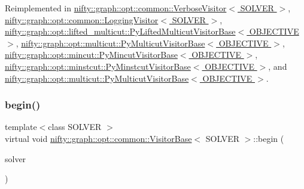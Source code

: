 Reimplemented in \hyperlink{classnifty_1_1graph_1_1opt_1_1common_1_1VerboseVisitor_a7ce06c6374afec8ecf6e5ceca4669682}{nifty\+::graph\+::opt\+::common\+::\+Verbose\+Visitor$<$ S\+O\+L\+V\+E\+R $>$}, \hyperlink{classnifty_1_1graph_1_1opt_1_1common_1_1LoggingVisitor_a19ea135ecf8fbc92a8a7792164c4fd44}{nifty\+::graph\+::opt\+::common\+::\+Logging\+Visitor$<$ S\+O\+L\+V\+E\+R $>$}, \hyperlink{classnifty_1_1graph_1_1opt_1_1lifted__multicut_1_1PyLiftedMulticutVisitorBase_ad7e8835d70def796b71cff0caa79c596}{nifty\+::graph\+::opt\+::lifted\+\_\+multicut\+::\+Py\+Lifted\+Multicut\+Visitor\+Base$<$ O\+B\+J\+E\+C\+T\+I\+V\+E $>$}, \hyperlink{classnifty_1_1graph_1_1opt_1_1multicut_1_1PyMulticutVisitorBase_a6b6922de3a94d5c872ecfff2a845a03b}{nifty\+::graph\+::opt\+::multicut\+::\+Py\+Multicut\+Visitor\+Base$<$ O\+B\+J\+E\+C\+T\+I\+V\+E $>$}, \hyperlink{classnifty_1_1graph_1_1opt_1_1mincut_1_1PyMincutVisitorBase_a99c335cf50430f381e66e826f6805e5b}{nifty\+::graph\+::opt\+::mincut\+::\+Py\+Mincut\+Visitor\+Base$<$ O\+B\+J\+E\+C\+T\+I\+V\+E $>$}, \hyperlink{classnifty_1_1graph_1_1opt_1_1minstcut_1_1PyMinstcutVisitorBase_a561220ee0991f93b6069a455fa84f130}{nifty\+::graph\+::opt\+::minstcut\+::\+Py\+Minstcut\+Visitor\+Base$<$ O\+B\+J\+E\+C\+T\+I\+V\+E $>$}, and \hyperlink{classnifty_1_1graph_1_1opt_1_1multicut_1_1PyMulticutVisitorBase_a6b6922de3a94d5c872ecfff2a845a03b}{nifty\+::graph\+::opt\+::multicut\+::\+Py\+Multicut\+Visitor\+Base$<$ O\+B\+J\+E\+C\+T\+I\+V\+E $>$}.

\mbox{\label{classnifty_1_1graph_1_1opt_1_1common_1_1VisitorBase_a8c4462a0cd838b0082f7157ad4b2d770}} 
\subsubsection{\texorpdfstring{begin()}{begin()}}
{\footnotesize\ttfamily template$<$class S\+O\+L\+V\+ER $>$ \\
virtual void \hyperlink{classnifty_1_1graph_1_1opt_1_1common_1_1VisitorBase}{nifty\+::graph\+::opt\+::common\+::\+Visitor\+Base}$<$ S\+O\+L\+V\+ER $>$\+::begin (\begin{DoxyParamCaption}\item[{\hyperlink{classnifty_1_1graph_1_1opt_1_1common_1_1VisitorBase_a433d03139897d4aefe27315b2bbb3adc}{Solver\+Type} $\ast$}]{solver }\end{DoxyParamCaption})\hspace{0.3cm}{\ttfamily [pure virtual]}}



